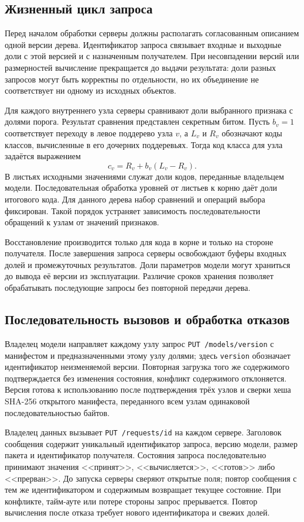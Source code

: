 \subsection{Жизненный цикл запроса}

Перед началом обработки серверы должны располагать согласованным
описанием одной версии дерева. Идентификатор запроса связывает входные
и выходные доли с этой версией и с назначенным получателем. При
несовпадении версий или размерностей вычисление прекращается до выдачи
результата: доли разных запросов могут быть корректны по отдельности,
но их объединение не соответствует ни одному из исходных объектов.

Для каждого внутреннего узла серверы сравнивают доли выбранного признака
с долями порога. Результат сравнения представлен секретным битом.
Пусть $b_v=1$ соответствует переходу в левое поддерево узла $v$, а
$L_v$ и $R_v$ обозначают коды классов, вычисленные в его дочерних
поддеревьях. Тогда код класса для узла задаётся выражением
\[
    c_v = R_v + b_v (L_v - R_v).
\]
В листьях исходными значениями служат доли кодов, переданные владельцем
модели. Последовательная обработка уровней от листьев к корню даёт доли
итогового кода. Для данного дерева набор сравнений и операций выбора
фиксирован. Такой порядок устраняет зависимость последовательности
обращений к узлам от значений признаков.

Восстановление производится только для кода в корне и только на стороне
получателя. После завершения запроса серверы освобождают буферы входных
долей и промежуточных результатов. Доли параметров модели могут храниться
до вывода её версии из эксплуатации. Различие сроков хранения позволяет
обрабатывать последующие запросы без повторной передачи дерева.

\subsection{Последовательность вызовов и обработка отказов}

Владелец модели направляет каждому узлу запрос \texttt{PUT /models/version} с манифестом и предназначенными этому узлу долями; здесь \texttt{version} обозначает идентификатор неизменяемой версии. Повторная загрузка того же содержимого подтверждается без изменения состояния, конфликт содержимого отклоняется. Версия готова к использованию после подтверждения трёх узлов и сверки хеша SHA-256 открытого манифеста, переданного всем узлам одинаковой последовательностью байтов.

Владелец данных вызывает \texttt{PUT /requests/id} на каждом сервере. Заголовок сообщения содержит уникальный идентификатор запроса, версию модели, размер пакета и идентификатор получателя. Состояния запроса последовательно принимают значения <<принят>>, <<вычисляется>>, <<готов>> либо <<прерван>>. До запуска серверы сверяют открытые поля; повтор сообщения с тем же идентификатором и содержимым возвращает текущее состояние. При конфликте, тайм-ауте или потере стороны запрос прерывается. Повтор вычисления после отказа требует нового идентификатора и свежих долей.

